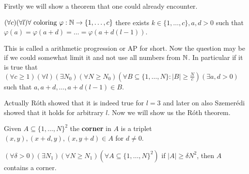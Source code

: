 Firstly we will show a theorem that one could already encounter.

\begin{thm}
	$(\forall c) (\forall l) \forall \text{ coloring } \varphi : \mathbb{N} \to \{1, \dots, c\}$ there exists $k \in \{1, \dots, c\}, a, d > 0$ such that $\varphi(a) = \varphi(a + d) = \dots = \varphi(a + d(l -1))$.
\end{thm}

This is called a arithmetic progression or AP for short. Now the question may be if we could somewhat limit it and not use all numbers from $\mathbb{N}$. In particular if it is true that $(\forall c \geq 1) (\forall l) (\exists N_0) (\forall N \geq N_0) (\forall B \subseteq \{1, \dots, N\} : |B| \geq \frac{N}{c}) (\exists a, d> 0)$ such that $a, a+d, \dots, a+d(l-1) \in B$.

Actually Róth showed that it is indeed true for $l = 3$ and later on also Szemerédi showed that it holds for arbitrary $l$. Now we will show us the Róth theorem.

\begin{defn}
	Given $A \subseteq \{1, \dots, N\}^2$ the \textbf{corner} in $A$ is a triplet $(x,y), (x+d,y), (x, y+d) \in A$ for $d \neq 0$.
\end{defn}

\begin{lemma}
	$(\forall \delta > 0) (\exists N_1)(\forall N \geq N_1) (\forall A \subseteq \{1, \dots, N\}^2)$ if $|A| \geq \delta N^2$, then $A$ contains a corner.
\end{lemma}

